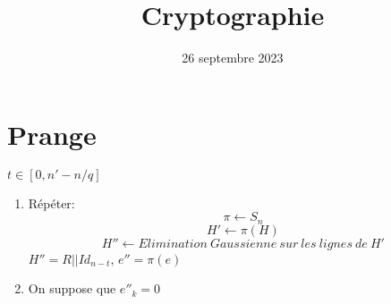 \documentclass[12pt]{article}
\title{Cryptographie}
\date{26 septembre 2023}
\theoremstyle{plain}
\theoremstyle{definition}
\theoremstyle{remark}
\begin{document}
\maketitle
\section{Prange}
$t\in [0,n'-n/q]$
\begin{enumerate}
    \item Répéter:
    \[\pi\leftarrow S_n\]
    \[H'\leftarrow \pi(H)\]
    \[H''\leftarrow Elimination~Gaussienne~sur~les~lignes~de~H'\]
    $H''=R||Id_{n-t}$, $e''=\pi(e)$
    \item On suppose que $e''_k=0$
\end{enumerate}
\end{document}
